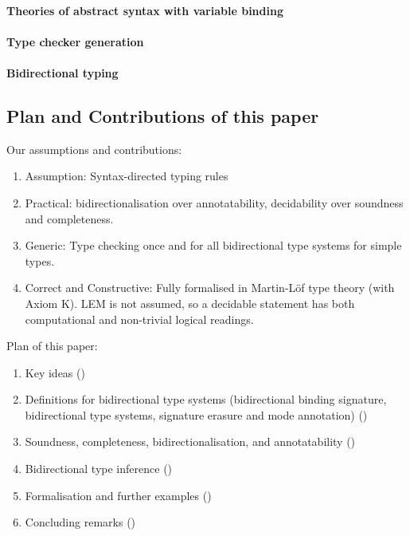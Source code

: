 \cite{Cimini2020,Cimini2022}

\citep{Ahrens2018,Fiore2022,Gheri2020,Ahrens2022}
\cite{Allais2021}

\paragraph{Theories of abstract syntax with variable binding}
\cite{Fiore1999,Hirschowitz2010,Ahrens2018,Fiore2022,Ahrens2021,Arkor2020,Hirschowitz2022}
\cite{Fiore2013,Hamana2011,Hamana2022}


\paragraph{Type checker generation}
\cite{Gast2004,Grewe2015,Pacak2020,Cimini2020}

\paragraph{Bidirectional typing}

\cite{Pierce2000}
\cite{Peyton-Jones2007}
\cite{Dunfield2021}


\subsection{Plan and Contributions of this paper}

Our assumptions and contributions:
\begin{enumerate}
  \item Assumption: Syntax-directed typing rules
  \item Practical: bidirectionalisation over annotatability, decidability over soundness and completeness.
  \item Generic: Type checking once and for all bidirectional type systems for simple types.
  \item Correct and Constructive: Fully formalised in Martin-Löf type theory (with Axiom K).
    LEM is not assumed, so a decidable statement has both computational and non-trivial logical readings.
\end{enumerate}

Plan of this paper:
\begin{enumerate}
  \item Key ideas ()
  \item Definitions for bidirectional type systems (bidirectional binding signature, bidirectional type systems, signature erasure and mode annotation) ()
  \item Soundness, completeness, bidirectionalisation, and annotatability ()
  \item Bidirectional type inference ()
  \item Formalisation and further examples ()
  \item Concluding remarks ()
\end{enumerate}



